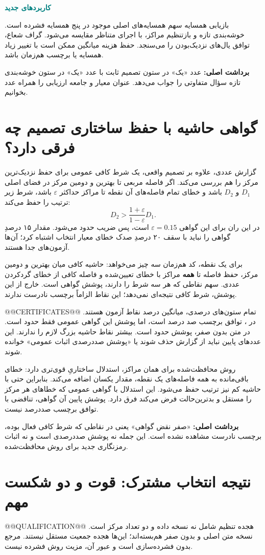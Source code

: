 \documentclass[11pt,a4paper]{article}
\newcommand{\lesson}[1]{\clearpage\section{#1}}
\newcommand{\key}[1]{\par\vspace{4pt}\noindent\colorbox{pale}{\parbox{\dimexpr\textwidth-2\fboxsep\relax}{\textbf{برداشت اصلی:} #1}}\par\vspace{3pt}}
\newcommand{\sub}[1]{\par\vspace{3pt}\textbf{\textcolor{teal}{#1}}\par}
\begin{document}
\sub{کاربردهای جدید}
بازیابی همسایه سهم همسایه‌های اصلی موجود در پنج همسایه فشرده است.  خوشه‌بندی تازه و بازتنظیم مراکز، با اجرای متناظر  مقایسه می‌شود.  گراف شعاع، توافق یال‌های نزدیک‌بودن را می‌سنجد. حفظ هزینه میانگین ممکن است با تغییر زیاد همسایه یا برچسب هم‌زمان باشد.
\key{عدد «یک» در ستون تصمیم ثابت با عدد «یک» در ستون خوشه‌بندی تازه سؤال متفاوتی را جواب می‌دهد. عنوان معیار و جامعه ارزیابی را همراه عدد بخوانیم.}

\lesson{گواهی حاشیه با حفظ ساختاری تصمیم چه فرقی دارد؟}
گزارش عددی، علاوه بر تصمیم واقعی، یک شرط کافی عمومی برای حفظ نزدیک‌ترین مرکز را هم بررسی می‌کند. اگر فاصله مربعی تا بهترین و دومین مرکز در فضای اصلی \(D_1\) و \(D_2\) باشد و خطای تمام فاصله‌های آن نقطه تا مراکز حداکثر \(\varepsilon\) باشد، شرط زیر ترتیب را حفظ می‌کند:
\[
 D_2>\frac{1+\varepsilon}{1-\varepsilon}D_1.
\]
در این ران برای این گواهی \(\varepsilon=0.15\) است، پس ضریب حدود  می‌شود. مقدار ۱۵ درصدِ گواهی را نباید با سقف ۲۰ درصدِ صدک خطای معیار انتخاب اشتباه کرد؛ آن‌ها آزمون‌های جدا هستند.

برای یک نقطه، کد هم‌زمان سه چیز می‌خواهد: حاشیه کافی میان بهترین و دومین مرکز، حفظ فاصله تا \textbf{همه} مراکز با خطای تعیین‌شده و فاصله کافی از خطای گردکردن عددی. سهم نقاطی که هر سه شرط را دارند، پوشش گواهی است. خارج از این پوشش، شرط کافی نتیجه‌ای نمی‌دهد؛ این نقاط الزاماً برچسب نادرست ندارند.

@@CERTIFICATES@@
تمام ستون‌های درصدی، میانگین درصد نقاط آزمون هستند. در ، توافق برچسب صد درصد است، اما پوشش این گواهی عمومی فقط حدود  است. در متن بدون صفر، پوشش حدود  است. بیشتر نقاط حاشیه بزرگ لازم را ندارند. این عددهای پایین نباید از گزارش حذف شوند یا «پوشش صددرصدی اثبات عمومی» خوانده شوند.

روش محافظت‌شده برای همان مراکز، استدلال ساختاریِ قوی‌تری دارد: خطای باقی‌مانده به همه فاصله‌های یک نقطه، مقدار یکسان اضافه می‌کند. بنابراین حتی با حاشیه کم نیز ترتیب حفظ می‌شود. این استدلال با گواهی عمومی که خطاهای هر مرکز را مستقل و بدترین‌حالت فرض می‌کند فرق دارد. پوشش پایین آن گواهی، تناقضی با توافق برچسب صددرصد نیست.
\key{«صفر نقض گواهی» یعنی در نقاطی که شرط کافی فعال بوده، برچسب نادرست مشاهده نشده است. این جمله نه پوشش صددرصدی است و نه اثبات رمزنگاری جدید برای روش محافظت‌شده.}

\lesson{نتیجه انتخاب مشترک: قوت و دو شکست مهم}
@@QUALIFICATION@@
هجده تنظیم شامل نه نسخه داده و دو تعداد مرکز است. نسخه متن اصلی و بدون صفر هم‌بسته‌اند؛ این‌ها هجده جمعیت مستقل نیستند.  مرجع بدون فشرده‌سازی است و عبور آن، مزیت روش فشرده نیست.
\end{document}
